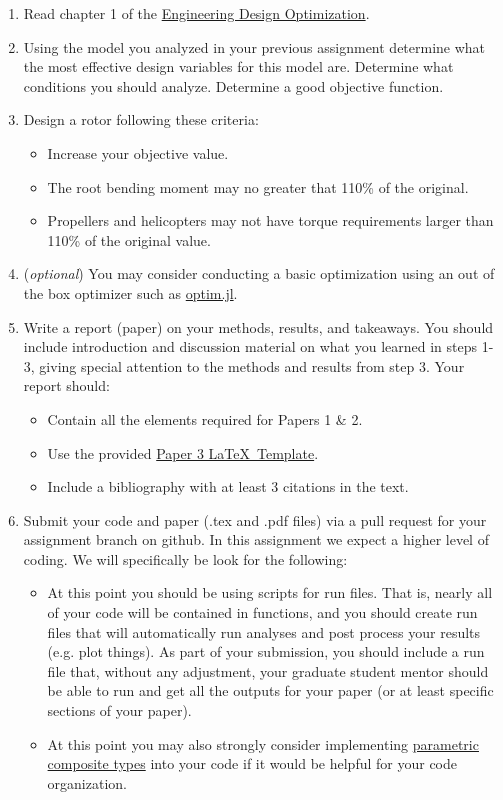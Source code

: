 \documentclass[12pt]{article}
\begin{document}
\begin{enumerate}
	\item Read chapter 1 of the \href{http://flowlab.groups.et.byu.net/mdobook.pdf}{Engineering Design Optimization}. 
	\item Using the model you analyzed in your previous assignment determine what the most effective design variables for this model are. Determine what conditions you should analyze. Determine a good objective function.
	\item Design a rotor following these criteria: 
	\begin{itemize}
		\item Increase your objective value.
		\item The root bending moment may no greater that 110\% of the original. 
		\item Propellers and helicopters may not have torque requirements larger than 110\% of the original value. 
	\end{itemize}
	\item[] (\textit{optional}) You may consider conducting a basic optimization using an out of the box optimizer such as \href{https://github.com/JuliaNLSolvers/Optim.jl}{optim.jl}. 
	\item Write a report (paper) on your methods, results, and takeaways. You should include introduction and discussion material on what you learned in steps 1-3, giving special attention to the methods and results from step 3. Your report should:
	\begin{itemize}
		\item Contain all the elements required for Papers 1 \& 2.
		\item Use the provided \href{https://github.com/byuflowlab/undergrad-onboarding/tree/497R/497R/latex_templates/paper3_wind}{Paper 3 \LaTeX~Template}.
		\item Include a bibliography with at least 3 citations in the text.
	\end{itemize}
	\item Submit your code and paper (.tex and .pdf files) via a pull request for your assignment branch on github. In this assignment we expect a higher level of coding. We will specifically be look for the following: 
	\begin{itemize}
		\item At this point you should be using scripts for run files.  That is, nearly all of your code will be contained in functions, and you should create run files that will automatically run analyses and post process your results (e.g. plot things).  As part of your submission, you should include a run file that, without any adjustment, your graduate student mentor should be able to run and get all the outputs for your paper (or at least specific sections of your paper).
		\item At this point you may also strongly consider implementing \href{https://docs.julialang.org/en/v1/manual/types/#Composite-Types}{parametric composite types} into your code if it would be helpful for your code organization. 
	\end{itemize}
\end{enumerate}
\end{document}
